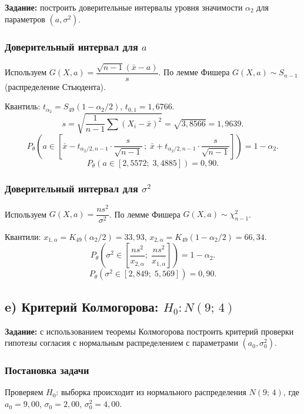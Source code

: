\documentclass[12pt,a4paper]{article}
\newcommand{\xbar}{\bar{x}}
\begin{document}
	\textbf{Задание:} построить доверительные интервалы уровня значимости $\alpha_2$
	для параметров $(a,\sigma^2)$.
	
	\subsubsection*{Доверительный интервал для $a$}
	
	Используем $G(X,a) = \dfrac{\sqrt{n-1}(\xbar-a)}{s}$. По лемме Фишера
	$G(X,a)\sim S_{n-1}$ (распределение Стьюдента).
	
	Квантиль: $t_{\alpha_2} = S_{49}(1-\alpha_2/2)$, $t_{0{,}1} = 1{,}6766$.
	\[
	s = \sqrt{\frac{1}{n-1}\sum(X_i-\xbar)^2} = \sqrt{3{,}8566} = 1{,}9639.
	\]
	\[
	P_\theta\!\left(a \in \left[\xbar - t_{\alpha_2/2,n-1}\cdot\frac{s}{\sqrt{n-1}}\,;\;
	\xbar + t_{\alpha_2/2,n-1}\cdot\frac{s}{\sqrt{n-1}}\right]\right)
	= 1 - \alpha_2.
	\]
	\[
	\boxed{P_\theta(a \in [2{,}5572;\; 3{,}4885]) = 0{,}90.}
	\]
	
	\subsubsection*{Доверительный интервал для $\sigma^2$}
	
	Используем $G(X,a) = \dfrac{ns^2}{\sigma^2}$. По лемме Фишера
	$G(X,a)\sim\chi^2_{n-1}$.
	
	Квантили: $x_{1,\alpha} = K_{49}(\alpha_2/2) = 33{,}93$,\;
	$x_{2,\alpha} = K_{49}(1-\alpha_2/2) = 66{,}34$.
	\[
	P_\theta\!\left(\sigma^2 \in \left[\frac{ns^2}{x_{2,\alpha}};\;\frac{ns^2}{x_{1,\alpha}}\right]\right)
	= 1-\alpha_2.
	\]
	\[
	\boxed{P_\theta(\sigma^2 \in [2{,}849;\; 5{,}569]) = 0{,}90.}
	\]
	
	\subsection{e) Критерий Колмогорова: \texorpdfstring{$H_0\colon N(9;\,4)$}{}}
	
	\textbf{Задание:} с использованием теоремы Колмогорова построить критерий
	проверки гипотезы согласия с нормальным распределением с параметрами
	$(a_0,\sigma_0^2)$.
	
	\subsubsection*{Постановка задачи}
	
	Проверяем $H_0$: выборка происходит из нормального распределения
	$N(9;\,4)$, где $a_0 = 9{,}00$, $\sigma_0 = 2{,}00$, $\sigma_0^2 = 4{,}00$.
	
\end{document}
